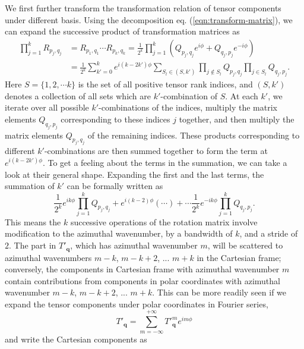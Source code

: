 \documentclass[a4paper, 11pt]{article}
\begin{document}
We first further transform the transformation relation of tensor components under different basis. Using the decomposition eq. (\ref{eqn:transform-matrix}), we can expand the successive product of transformation matrices as
\[
\begin{aligned}
    \prod_{j=1}^k R_{p_j,q_j} &= R_{p_1,q_1}\cdots R_{p_k,q_k} = \frac{1}{2^k} \prod_{j=1}^k \left(Q_{p_j,q_j} e^{i\phi} + Q_{q_j,p_j} e^{-i\phi}\right) \\ 
    &= \frac{1}{2^k} \sum_{k'=0}^k e^{i(k-2k')\phi} \sum_{S_l \in (S, k')} \prod_{j\notin S_l} Q_{p_j,q_j} \prod_{j\in S_l} Q_{q_j,p_j}.
\end{aligned}
\]
Here $S=\{1,2,\cdots k\}$ is the set of all positive tensor rank indices, and $(S, k')$ denotes a collection of all sets which are $k'$-combination of $S$. At each $k'$, we iterate over all possible $k'$-combinations of the indices, multiply the matrix elements $Q_{q_j, p_j}$ corresponding to these indices $j$ together, and then multiply the matrix elements $Q_{p_j,q_j}$ of the remaining indices. These products corresponding to different $k'$-combinations are then summed together to form the term at $e^{i(k - 2k')\phi}$. To get a feeling about the terms in the summation, we can take a look at their general shape. Expanding the first and the last terms, the summation of $k'$ can be formally written as
\[
    \frac{1}{2^k} e^{ik\phi} \prod_{j=1}^k Q_{p_j,q_j} + e^{i(k-2)\phi} \left(\cdots\right) + \cdots \frac{1}{2^k} e^{-ik\phi} \prod_{j=1}^k Q_{q_j,p_j}.
\]
This means the $k$ successive operations of the rotation matrix involve modification to the azimuthal wavenumber, by a bandwidth of $k$, and a stride of $2$. The part in $T'_\mathbf{q}$, which has azimuthal wavenumber $m$, will be scattered to azimuthal wavenumbers $m-k$, $m-k+2$, ... $m+k$ in the Cartesian frame; conversely, the components in Cartesian frame with azimuthal wavenumber $m$ contain contributions from components in polar coordinates with azimuthal wavenumber $m-k$, $m-k+2$, ... $m+k$. This can be more readily seen if we expand the tensor components under polar coordinates in Fourier series,
\begin{equation}
    T'_{\mathbf{q}} = \sum_{m = -\infty}^{+\infty} T'^{m}_{\mathbf{q}} e^{im\phi}
\end{equation}
and write the Cartesian components as
\end{document}
